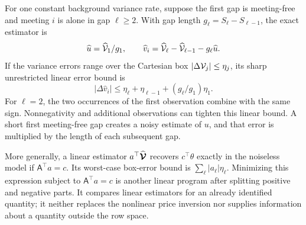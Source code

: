 For one constant background variance rate, suppose the first gap is meeting-free and meeting $i$ is alone in gap $\ell\geq2$. With gap length $g_\ell=S_\ell-S_{\ell-1}$, the exact estimator is
\[
\widehat u=\widehat{\mathcal V}_1/g_1,\qquad
\widehat v_i=\widehat{\mathcal V}_\ell-\widehat{\mathcal V}_{\ell-1}-g_\ell\widehat u.
\]
If the variance errors range over the Cartesian box $|\Delta \mathcal V_j|\leq\eta_j$, its sharp unrestricted linear error bound is
\begin{equation}\label{eq:differror}
|\Delta\widehat v_i|\leq\eta_\ell+\eta_{\ell-1}
                                      +(g_\ell/g_1)\eta_1.
\end{equation}
For $\ell=2$, the two occurrences of the first observation combine with the same sign. Nonnegativity and additional observations can tighten this linear bound. A short first meeting-free gap creates a noisy estimate of $u$, and that error is multiplied by the length of each subsequent gap.

More generally, a linear estimator $a^\top\widehat{\boldsymbol{\mathcal V}}$ recovers $c^\top\theta$ exactly in the noiseless model if $\mathsf A^\top a=c$. Its worst-case box-error bound is $\sum_\ell|a_\ell|\eta_\ell$. Minimizing this expression subject to $\mathsf A^\top a=c$ is another linear program after splitting positive and negative parts. It compares linear estimators for an already identified quantity; it neither replaces the nonlinear price inversion nor supplies information about a quantity outside the row space.
